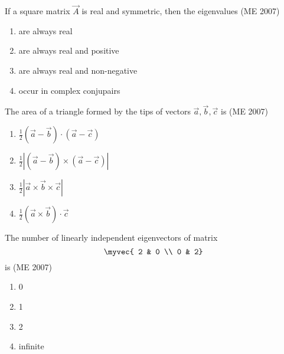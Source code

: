 \item If a square matrix $ \vec{A} $ is real and symmetric, then the eigenvalues
\hfill (ME 2007)
\begin{multicols}{2}
\begin{enumerate}
\item are always real
\item are always real and positive
\item are always real and non-negative
\item occur in complex conjupairs
\end{enumerate}
\end{multicols}

\item The area of a triangle formed by the tips of vectors $ \vec{a}, \vec{b}, \vec{c} $ is
\hfill (ME 2007)
\begin{multicols}{2}
	\begin{enumerate}[itemsep=1ex]
\item $\frac{1}{2} (\vec{a} - \vec{b}) \cdot (\vec{a} - \vec{c})$
\item $\frac{1}{2} \left| (\vec{a} - \vec{b}) \times (\vec{a} - \vec{c}) \right|$
\item $\frac{1}{2} \left| \vec{a} \times \vec{b} \times \vec{c} \right|$
\item $\frac{1}{2} (\vec{a} \times \vec{b}) \cdot \vec{c}$
\end{enumerate}
\end{multicols}
\item The number of linearly independent eigenvectors of matrix
	$$\myvec{
2 & 0 \\
0 & 2}
$$
is
\hfill (ME 2007)
\begin{multicols}{4}
\begin{enumerate}
\item 0
\item 1
\item 2
\item infinite
\end{enumerate}
\end{multicols}

